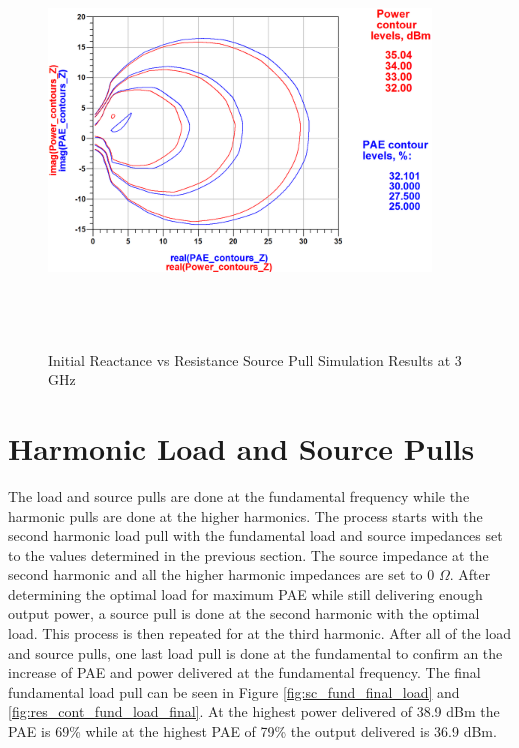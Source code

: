 \begin{figure}
  \centering
  \includegraphics[width=4in,height=4in,keepaspectratio]{figures/simulation/res_fund_source}\\
  \caption{Initial Reactance vs Resistance Source Pull Simulation Results at 3 GHz}
  \label{fig:xy_fund_source}
\end{figure}


\section{Harmonic Load and Source Pulls}

The load and source pulls are done at the fundamental frequency while the harmonic pulls are done at the higher harmonics. The process starts with the second harmonic load pull with the fundamental load and source impedances set to the values determined in the previous section. The source impedance at the second harmonic and all the higher harmonic impedances are set to 0 $\Omega$. After determining the optimal load for maximum PAE while still delivering enough output power, a source pull is done at the second harmonic with the optimal load. This process is then repeated for at the third harmonic. After all of the load and source pulls, one last load pull is done at the fundamental to confirm an the increase of PAE and power delivered at the fundamental frequency. The final fundamental load pull can be seen in Figure \ref{fig:sc_fund_final_load} and \ref{fig:res_cont_fund_load_final}. At the highest power delivered of 38.9 dBm the PAE is 69\% while at the highest PAE of 79\% the output delivered is 36.9 dBm.

